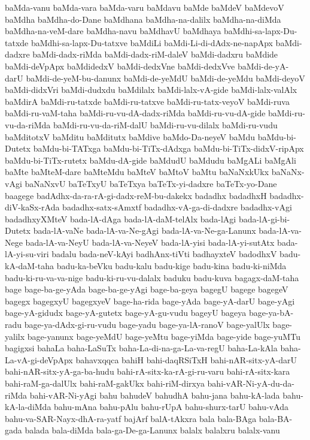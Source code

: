 {baMda-vanu
baMda-vara
baMda-varu
baMdavu
baMde
baMdeV
baMdevoV
baMdha
baMdha-do-Dane
baMdhana
baMdha-na-dalilx
baMdha-na-diMda
baMdha-na-veM-dare
baMdha-navu
baMdhavU
baMdhaya
baMdhi-sa-lapx-Du-tatxde
baMdhi-sa-lapx-Du-tatxve
baMdiLi
baMdi-Li-di-dAdx-ne-napApx
baMdi-dadxre
baMdi-dadx-riMda
baMdi-dadx-riM-daleV
baMdi-dadxru
baMdide
baMdi-deVpApx
baMdidedxV
baMdi-dedxVne
baMdi-dedxVve
baMdi-de-yA-darU
baMdi-de-yeM-bu-danunx
baMdi-de-yeMdU
baMdi-de-yeMdu
baMdi-deyoV
baMdi-didxVri
baMdi-dudxdu
baMdilalx
baMdi-lalx-vA-gide
baMdi-lalx-valAlx
baMdirA
baMdi-ru-tatxde
baMdi-ru-tatxve
baMdi-ru-tatx-veyoV
baMdi-ruva
baMdi-ru-vaM-taha
baMdi-ru-vu-dA-dadx-riMda
baMdi-ru-vu-dA-gide
baMdi-ru-vu-da-riMda
baMdi-ru-vu-da-riM-dalU
baMdi-ru-vu-dilalx
baMdi-ru-vudu
baMditotxV
baMditu
baMditutx
baMdive
baMdo-Da-neyeV
baMdu
baMdu-bi-Dutetx
baMdu-bi-TATxga
baMdu-bi-TiTx-dAdxga
baMdu-bi-TiTx-didxV-ripApx
baMdu-bi-TiTx-rutetx
baMdu-dA-gide
baMdudU
baMdudu
baMgALi
baMgAli
baMte
baMteM-dare
baMteMdu
baMteV
baMtoV
baMtu
baNaNxkUkx
baNaNx-vAgi
baNaNxvU
baTeTxyU
baTeTxya
baTeTx-yi-dadxre
baTeTx-yo-Dane
baagege
badAdhx-da-ra-rA-gi-dadx-reM-bu-dakekx
badadhx
badadhxH
badadhx-diV-kaSx-rAda
badadhx-satx-sAmxtf
badadhx-vA-ga-di-dadxre
badadhx-vAgi
badadhxyXMteV
bada-lA-dAga
bada-lA-daM-telAlx
bada-lAgi
bada-lA-gi-bi-Dutetx
bada-lA-vaNe
bada-lA-va-Ne-gAgi
bada-lA-va-Ne-ga-Lanunx
bada-lA-va-Nege
bada-lA-va-NeyU
bada-lA-va-NeyeV
bada-lA-yisi
bada-lA-yi-sutAtx
bada-lA-yi-su-viri
badalu
bada-neV-kAyi
badhAnx-tiVti
badhayxteV
badodhxV
badu-kA-daM-taha
badu-ka-beVku
badu-kalu
badu-kige
badu-kina
badu-ki-niMda
badu-ki-ru-va-va-nige
badu-ki-ru-vu-dalalx
baduku
badu-kuva
bagagx-daM-taha
bage
bage-ba-ge-yAda
bage-ba-ge-yAgi
bage-ba-geya
bagegU
bagege
bagegeV
bagegx
bagegxyU
bagegxyeV
bage-ha-rida
bage-yAda
bage-yA-darU
bage-yAgi
bage-yA-gidudx
bage-yA-gutetx
bage-yA-gu-vudu
bageyU
bageya
bage-ya-bA-radu
bage-ya-dAdx-gi-ru-vudu
bage-yadu
bage-ya-lA-ranoV
bage-yalUlx
bage-yalilx
bage-yanunx
bage-yeMdU
bage-yeMtu
bage-yiMda
bage-yide
bage-yuMTu
bagigxsi
bahaLa
baha-LaSuTx
baha-La-di-na-ga-La-va-regU
baha-La-kAla
baha-La-vA-gi-deVpApx
bahavxqqca
bahiH
bahi-daqRSiTxH
bahi-nAR-sitx-yA-darU
bahi-nAR-sitx-yA-ga-ba-hudu
bahi-rA-sitx-ka-rA-gi-ru-varu
bahi-rA-sitx-kara
bahi-raM-ga-dalUlx
bahi-raM-gakUkx
bahi-riM-dirxya
bahi-vAR-Ni-yA-du-da-riMda
bahi-vAR-Ni-yAgi
bahu
bahudeV
bahudhA
bahu-jana
bahu-kA-lada
bahu-kA-la-diMda
bahu-mAna
bahu-pAlu
bahu-rUpA
bahu-shurx-tarU
bahu-vAda
bahu-va-SAR-Nayx-dhA-ra-yatf
bajArf
balA-tAkxra
bala
bala-BAga
bala-BA-gada
balada
bala-diMda
bala-ga-De-ga-Lanunx
balalx
balalxru
balalx-vanu
}
